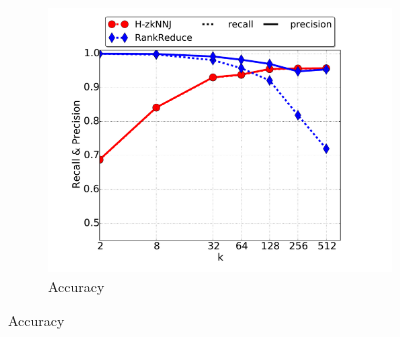 \begin{figure}[t]
\begin{subfigure}[b]{0.3\textwidth}
        \end{subfigure}%
        \begin{subfigure}[b]{0.3\textwidth}
                 \includegraphics[width=\textwidth]{img-perf/geo/k/accuracy.pdf} 
                \caption{Accuracy\label{fig:geo_k_acc}}
                

\end{subfigure}
\end{figure}
